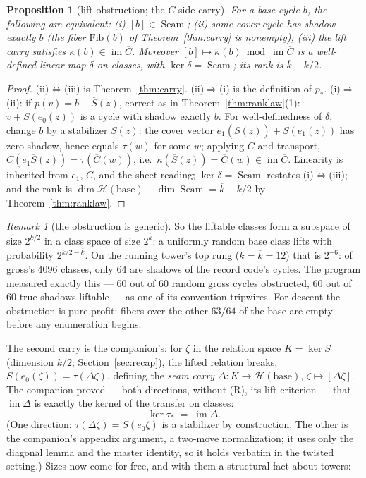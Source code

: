 \documentclass[11pt]{article}
\theoremstyle{plain}
\newtheorem{proposition}[theorem]{Proposition}
\theoremstyle{definition}
\theoremstyle{remark}
\newtheorem{remark}[theorem]{Remark}
\newcommand{\imD}{\operatorname{im}\Delta}
\newcommand{\Seam}{\operatorname{Seam}}
\newcommand{\clH}{\mathcal{H}}
\newcommand{\base}{\mathrm{base}}
\newcommand{\ov}[1]{\overline{#1}}
\begin{document}
\begin{proposition}[lift obstruction; the $C$-side carry]
\label{prop:liftobstruction}
For a base cycle $b$, the following are equivalent:
\emph{(i)} $[b] \in \Seam$;\;
\emph{(ii)} some cover cycle has shadow exactly $b$
(the fiber $\mathrm{Fib}(b)$ of Theorem~\ref{thm:carry} is nonempty);\;
\emph{(iii)} the lift carry satisfies $\kappa(b) \in \operatorname{im}
\ov C$.
Moreover $[b] \mapsto \kappa(b) \bmod \operatorname{im}\ov C$ is a
well-defined linear map $\delta$ on classes, with $\ker \delta = \Seam$;
its rank is $\ov k - k/2$.
\end{proposition}

\begin{proof}
(ii)$\iff$(iii) is Theorem~\ref{thm:carry}. (ii)$\Rightarrow$(i) is the
definition of $p_*$. (i)$\Rightarrow$(ii): if $p(v) = b + \ov S(z)$,
correct as in Theorem~\ref{thm:ranklaw}(1): $v + S(e_0(z))$ is a cycle
with shadow exactly $b$. For well-definedness of $\delta$, change $b$ by
a stabilizer $\ov S(z)$: the cover vector $e_1(\ov S(z)) + S(e_1(z))$ has
zero shadow, hence equals $\tau(w)$ for some $w$; applying $C$ and
transport, $C(e_1 \ov S(z)) = \tau(\ov C(w))$, i.e.\ $\kappa(\ov S(z)) =
\ov C(w) \in \operatorname{im} \ov C$. Linearity is inherited from
$e_1$, $C$, and the sheet-reading; $\ker \delta = \Seam$ restates
(i)$\iff$(iii); and the rank is $\dim \clH(\base) - \dim \Seam = \ov k -
k/2$ by Theorem~\ref{thm:ranklaw}.
\end{proof}

\begin{remark}[the obstruction is generic]\label{rem:obstructiongeneric}
So the liftable classes form a subspace of size $2^{k/2}$ in a class
space of size $2^{\ov k}$: a uniformly random base class lifts with
probability $2^{k/2 - \ov k}$. On the running tower's top rung ($k = \ov
k = 12$) that is $2^{-6}$: of gross's $4096$ classes, only $64$ are
shadows of the record code's cycles. The program measured exactly this
--- 60 out of 60 random gross cycles obstructed, 60 out of 60 true
shadows liftable --- as one of its convention tripwires. For descent the
obstruction is pure profit: fibers over the other $63/64$ of the base are
empty before any enumeration begins.
\end{remark}

The second carry is the companion's: for $\zeta$ in the relation space $K
= \ker \ov S$ (dimension $\ov k/2$; Section~\ref{sec:recap}), the lifted
relation breaks, $S(e_0(\zeta)) = \tau(\Delta\zeta)$, defining the
\emph{seam carry} $\Delta : K \to \clH(\base)$, $\zeta \mapsto
[\Delta\zeta]$. The companion proved --- both directions, without (R),
its lift criterion --- that $\imD$ is exactly the kernel of the transfer
on classes:
\begin{equation}\label{eq:liftcrit}
\ker \tau_* \;=\; \imD .
\end{equation}
(One direction: $\tau(\Delta\zeta) = S(e_0 \zeta)$ is a stabilizer by
construction. The other is the companion's appendix argument, a two-move
normalization; it uses only the diagonal lemma and the master identity,
so it holds verbatim in the twisted setting.) Sizes now come for free,
and with them a structural fact about towers:
\end{document}
